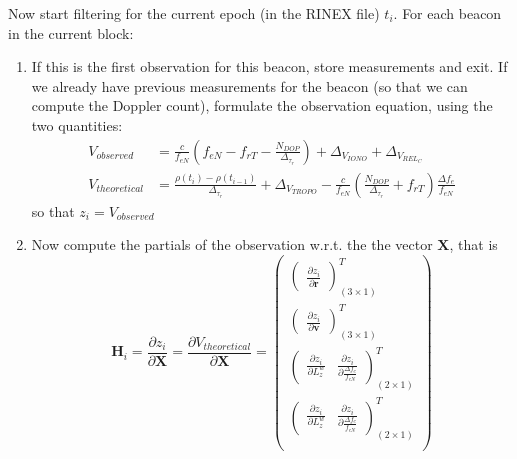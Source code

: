 Now start filtering for the current epoch (in the RINEX file) $t_i$. For each 
beacon in the current block:
\begin{enumerate}
    \item If this is the first observation for this beacon, store measurements 
        and exit. If we already have previous measurements for the beacon (so 
        that we can compute the Doppler count), formulate the observation 
        equation, using the two quantities:
        \begin{equation}
            \begin{aligned}
              V_{observed} &= \frac{c}{f_{eN}} 
                \left( f_{eN} - f_{rT} - \frac{N_{DOP}}{\Delta _{\tau_r}} \right)
                + \Delta _{V_{IONO}} + \Delta _{V_{REL_C}} \\
              V_{theoretical} &= \frac{\rho(t_i) - \rho(t_{i-1})}{\Delta _{\tau_r}} + \Delta _{V_{TROPO}} 
                - \frac{c}{f_{eN}} \left( \frac{N_{DOP}}{\Delta _{\tau_r}} + f_{rT} \right) 
                \frac{\Delta f_e}{f_{eN}}
            \end{aligned}
          \end{equation}
        so that $z_i = V_{observed}$
    \item Now compute the partials of the observation w.r.t. the the vector $\bm{X}$, that is 
        \begin{equation}
          \bm{H}_i = \frac{\partial z_i}{\partial \bm{X}} = \frac{\partial V_{theoretical}}{\partial \bm{X}} = 
          \begin{pmatrix} 
            \begin{pmatrix}\frac{\partial z_i}{\partial \bm{r}}\end{pmatrix}^T_{(3 \times 1)} \\
            \begin{pmatrix}\frac{\partial z_i}{\partial \bm{v}}\end{pmatrix}^T_{(3 \times 1)} \\
            \begin{pmatrix}\frac{\partial z_i}{\partial L^w_z} & \frac{\partial z_i}{\partial \frac{\Delta f_e}{f_{eN}}}\end{pmatrix}^T_{(2 \times 1)} \\
            \begin{pmatrix}\frac{\partial z_i}{\partial L^w_z} & \frac{\partial z_i}{\partial \frac{\Delta f_e}{f_{eN}}}\end{pmatrix}^T_{(2 \times 1)} \\

\end{pmatrix}
\end{equation}
\end{enumerate}
